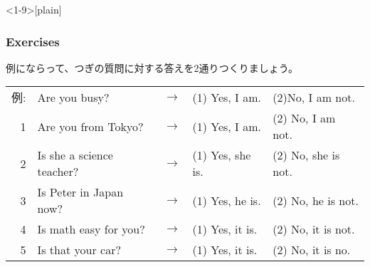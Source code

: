\documentclass[aspectratio=169]{beamer}
\begin{document}
\begin{frame}<1-9>[plain]\frametitle{Exercises}
例にならって、つぎの質問に対する答えを2通りつくりましょう。



\begin{tabular}{rlcll}
例:& Are you busy?& $\rightarrow$&(1) Yes, I am.&(2)No, I am not.\\
1&Are you from Tokyo?&$\rightarrow$&(1) Yes, I am.&(2) No, I am not.\\
2&Is she a science teacher?&$\rightarrow$& (1) Yes, she is.&(2) No, she is not.\\
3&Is Peter in Japan now?&$\rightarrow$&(1) Yes, he is.&(2) No, he is not.\\
4&Is math easy for you?&$\rightarrow$&(1) Yes, it is.&(2) No, it is not.\\
5&Is that your car?&$\rightarrow$&(1) Yes, it is.&(2) No, it is no.
\end{tabular}

\end{frame}
\end{document}
